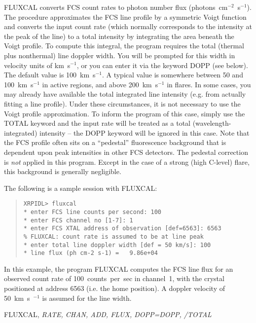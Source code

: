 {{{FLUXCAL converts FCS count rates  to photon number flux
\hbox{(photons~cm$^{-2}$~s$^{-1}$)}. The procedure approximates the FCS line  profile
by a symmetric Voigt function and converts the input count rate (which 
normally corresponds to the intensity at the peak of the line) to a total
intensity  by integrating the area beneath the Voigt profile.  To compute this
integral,  the program requires the total (thermal plus nonthermal) line
doppler width. You will be prompted for this width in velocity units of
km~s$^{-1}$, or you can enter it via the keyword DOPP (see below). The default
value is 100~km~s$^{-1}$.  A  typical value is somewhere between 50 and
100~km~s$^{-1}$ in active regions, and  above 200~km~s$^{-1}$ in flares. In
some cases, you may already have available  the total integrated line intensity
(e.g.\/ from actually fitting a line  profile). Under these circumstances, it is
not necessary to use the Voigt  profile approximation. To inform the program of
this case, simply use the TOTAL keyword  and the input rate will be treated as
a total  (wavelength-integrated) intensity -- the DOPP keyword will be ignored
in this case. Note that the FCS profile often sits on a ``pedestal'' 
fluorescence background that is dependent upon peak intensities in other FCS 
detectors. The pedestal correction is {\it not} applied in this program. Except 
in the case of a strong (high C-level) flare, this background is generally 
negligible.

The following is a sample session with FLUXCAL:
\begin{quote}
\begin{verbatim}
XRPIDL> fluxcal
* enter FCS line counts per second: 100
* enter FCS channel no [1-7]: 1
* enter FCS XTAL address of observation [def=6563]: 6563
% FLUXCAL: count rate is assumed to be at line peak
* enter total line doppler width [def = 50 km/s]: 100
* line flux (ph cm-2 s-1) =   9.86e+04
\end{verbatim}
\end{quote}
In this example, the program FLUXCAL computes the FCS line flux 
for an observed count rate of 100~counts~per~sec in channel~1, with
the crystal positioned at address 6563 (i.e. the home position).
A doppler velocity of 50~km~s~$^{-1}$ is assumed for the line width.


FLUXCAL, {\it RATE, CHAN, ADD, FLUX, DOPP=DOPP, /TOTAL}


}}}
